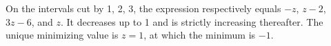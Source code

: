 On the intervals cut by 1, 2, 3, the expression respectively equals $-z $, $ z-2 $, $ 3z-6 $, and $ z $. It decreases up to 1 and is strictly increasing thereafter. The unique minimizing value is $\boxed{z=1}$, at which the minimum is $-1 $.
